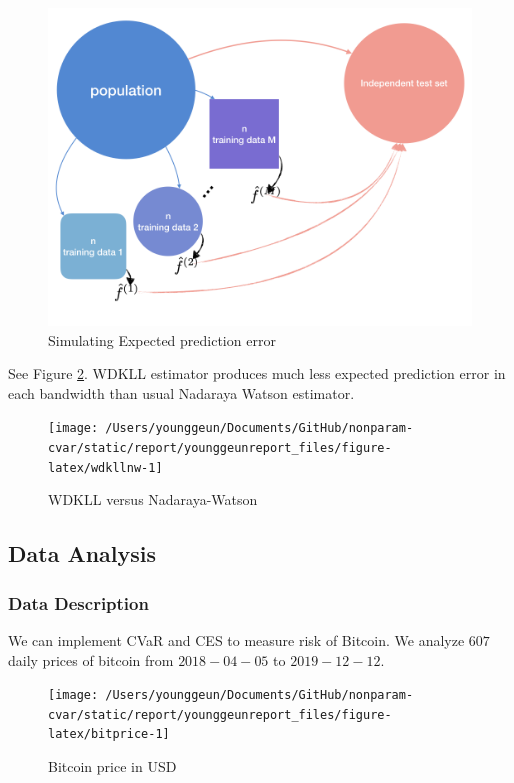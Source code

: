 \documentclass[
]{article}
\theoremstyle{definition}
\theoremstyle{definition}
\theoremstyle{definition}
\theoremstyle{remark}
\begin{document}
\begin{figure}[H]

{\centering \includegraphics[width=0.7\linewidth]{../docs/mc_epe} 

}

\caption{Simulating Expected prediction error}\label{fig:mctest}
\end{figure}

See Figure \ref{fig:wdkllnw}. WDKLL estimator produces much less expected prediction error in each bandwidth than usual Nadaraya Watson estimator.

\begin{figure}[H]

{\centering \texttt{[image: /Users/younggeun/Documents/GitHub/nonparam-cvar/static/report/younggeunreport\_files/figure-latex/wdkllnw-1]} 

}

\caption{WDKLL versus Nadaraya-Watson}\label{fig:wdkllnw}
\end{figure}

\hypertarget{data-analysis}{%
\subsection{Data Analysis}\label{data-analysis}}

\hypertarget{data-description}{%
\subsubsection{Data Description}\label{data-description}}

We can implement CVaR and CES to measure risk of Bitcoin. We analyze \(607\) daily prices of bitcoin from \(2018-04-05\) to \(2019-12-12\).

\begin{figure}[H]

{\centering \texttt{[image: /Users/younggeun/Documents/GitHub/nonparam-cvar/static/report/younggeunreport\_files/figure-latex/bitprice-1]} 

}

\caption{Bitcoin price in USD}\label{fig:bitprice}
\end{figure}
\end{document}
